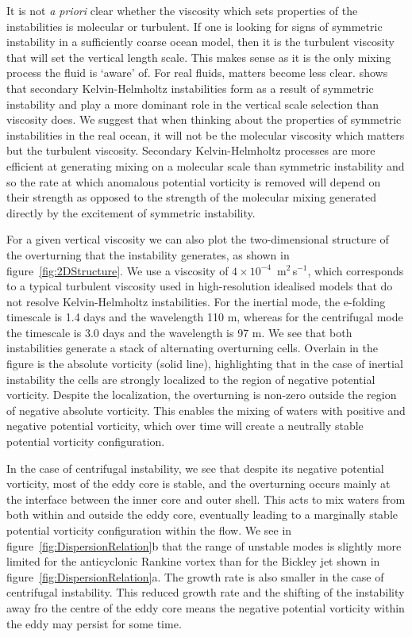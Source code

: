 It is not \textit{a priori} clear whether the viscosity which sets properties of the instabilities is molecular or turbulent. If one is looking for signs of symmetric instability in a sufficiently coarse ocean model, then it is the turbulent viscosity that will set the vertical length scale. This makes sense as it is the only mixing process the fluid is `aware' of. For real fluids, matters become less clear. \citet{Griffiths2003a} shows that secondary Kelvin-Helmholtz instabilities form as a result of symmetric instability and play a more dominant role in the vertical scale selection than viscosity does. We suggest that when thinking about the properties of symmetric instabilities in the real ocean, it will not be the molecular viscosity which matters but the turbulent viscosity. Secondary Kelvin-Helmholtz processes are more efficient at generating mixing on a molecular scale than symmetric instability and so the rate at which anomalous potential vorticity is removed will depend on their strength as opposed to the strength of the molecular mixing generated directly by the excitement of symmetric instability.

For a given vertical viscosity we can also plot the two-dimensional structure of the overturning that the instability generates, as shown in figure~\ref{fig:2DStructure}. We use a viscosity of $4 \times 10 ^{-4}$~m$^2$\,s$^{-1}$, which corresponds to a typical turbulent viscosity used in high-resolution idealised models that do not resolve Kelvin-Helmholtz instabilities. For the inertial mode, the e-folding timescale is 1.4 days and the wavelength 110 m, whereas for the centrifugal mode the timescale is 3.0 days and the wavelength is 97 m. We see that both instabilities generate a stack of alternating overturning cells. Overlain in the figure is the absolute vorticity (solid line), highlighting that in the case of inertial instability the cells are strongly localized to the region of negative potential vorticity. Despite the localization, the overturning is non-zero outside the region of negative absolute vorticity. This enables the mixing of waters with positive and negative potential vorticity, which over time will create a neutrally stable potential vorticity configuration.

In the case of centrifugal instability, we see that despite its negative potential vorticity, most of the eddy core is stable, and the overturning occurs mainly at the interface between the inner core and outer shell. This acts to mix waters from both within and outside the eddy core, eventually leading to a marginally stable potential vorticity configuration within the flow. We see in figure~\ref{fig:DispersionRelation}b that the range of unstable modes is slightly more limited for the anticyclonic Rankine vortex than for the Bickley jet shown in figure~\ref{fig:DispersionRelation}a. The growth rate is also smaller in the case of centrifugal instability. This reduced growth rate and the shifting of the instability away fro the centre of the eddy core means the negative potential vorticity within the eddy may persist for some time.


